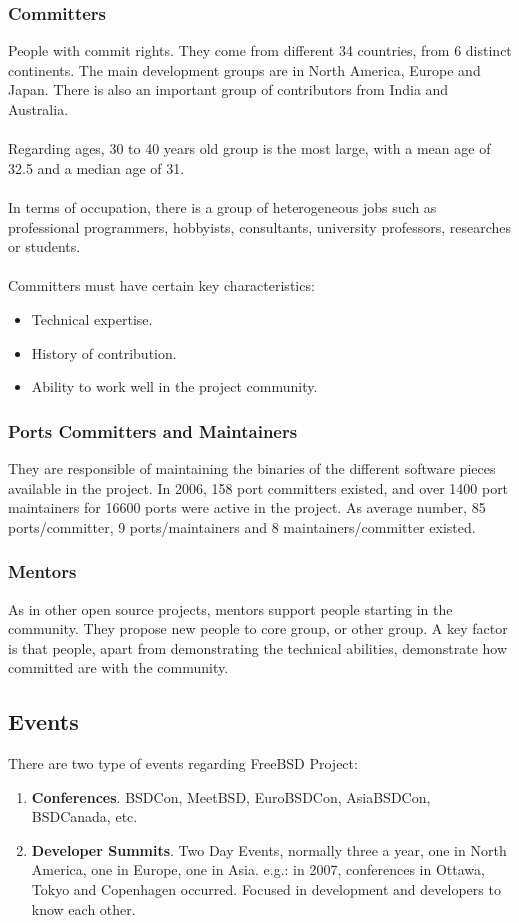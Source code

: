 \documentclass[11pt]{article}
\begin{document}
\subsubsection{Committers} 
People with commit rights. They come from different 34 countries, from 6 distinct continents. The main development groups are in North America, Europe and Japan. There is also an important group of contributors from India and Australia.\\
\\
Regarding ages, 30 to 40 years old group is the most large, with a mean age of 32.5 and a median age of 31.\\
\\
In terms of occupation, there is a group of heterogeneous jobs such as professional programmers, hobbyists, consultants, university professors, researches or students.\\
\\
Committers must have certain key characteristics:
\begin{itemize}\itemsep0pt
\item{Technical expertise}.
\item{History of contribution}.
\item{Ability to work well in the project community}.
\end{itemize}
\subsubsection{Ports Committers and Maintainers} 
They are responsible of maintaining the binaries of the different software pieces available in the project.
In 2006, 158 port committers existed, and over 1400 port maintainers for 16600 ports were active in the project. As average number, 85 ports/committer, 9 ports/maintainers and 8 maintainers/committer existed.
\subsubsection{Mentors} 
As in other open source projects, mentors support people starting in the community.
They propose new people to core group, or other group. A key factor is that people, apart from demonstrating the technical abilities, demonstrate how committed are with the community.
\subsection{Events}
There are two type of events regarding FreeBSD Project:
\begin{enumerate}\itemsep0pt
\item{\textbf{Conferences}}. BSDCon, MeetBSD, EuroBSDCon, AsiaBSDCon, BSDCanada, etc.
\item{\textbf{Developer Summits}}. Two Day Events, normally three a year, one in North America, one in Europe, one in Asia. e.g.: in 2007, conferences in Ottawa, Tokyo and Copenhagen occurred. Focused in development and developers to know each other.
\end{enumerate}
\end{document}
